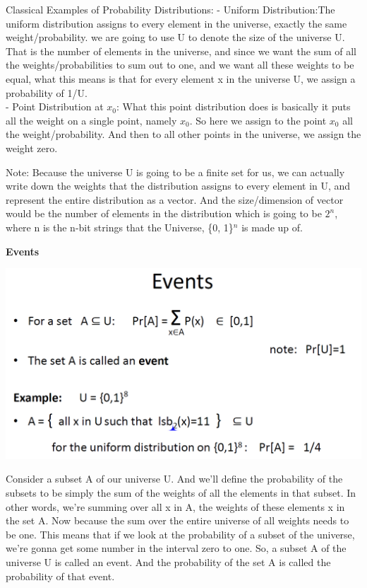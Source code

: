 \documentclass[11pt]{article}
\makeatletter
\def\maxwidth{\ifdim\Gin@nat@width>\linewidth\linewidth
    \else\Gin@nat@width\fi}
\let\Oldincludegraphics\includegraphics
\renewcommand{\includegraphics}[1]{\Oldincludegraphics[width=.8\maxwidth]{#1}}
\makeatother
\begin{document}
Classical Examples of Probability Distributions: - Uniform
Distribution:The uniform distribution assigns to every element in the
universe, exactly the same weight/probability. we are going to use
\textbar{}U\textbar{} to denote the size of the universe U. That is the
number of elements in the universe, and since we want the sum of all the
weights/probabilities to sum out to one, and we want all these weights
to be equal, what this means is that for every element x in the universe
U, we assign a probability of 1/\textbar{}U\textbar{}.\\
- Point Distribution at \(x_0\): What this point distribution does is
basically it puts all the weight on a single point, namely \(x_0\). So
here we assign to the point \(x_0\) all the weight/probability. And then
to all other points in the universe, we assign the weight zero.

Note: Because the universe U is going to be a finite set for us, we can
actually write down the weights that the distribution assigns to every
element in U, and represent the entire distribution as a vector. And the
size/dimension of vector would be the number of elements in the
distribution which is going to be \(2^n\), where n is the n-bit strings
that the Universe, \{0, 1\}\(^n\) is made up of.

\textbf{Events}

\includegraphics{./Images/Events.png}

Consider a subset A of our universe U. And we'll define the probability
of the subsets to be simply the sum of the weights of all the elements
in that subset. In other words, we're summing over all x in A, the
weights of these elements x in the set A. Now because the sum over the
entire universe of all weights needs to be one. This means that if we
look at the probability of a subset of the universe, we're gonna get
some number in the interval zero to one. So, a subset A of the universe
U is called an event. And the probability of the set A is called the
probability of that event.
\end{document}
